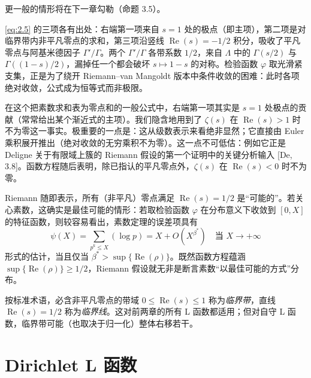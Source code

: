 更一般的情形将在下一章勾勒（命题 3.5）。

\begin{annote}
\eqref{eq:2.5} 的三项各有出处：右端第一项来自 $s=1$ 处的极点（即主项），第二项是对临界带内非平凡零点的求和，第三项沿竖线 $\operatorname{Re}(s)=-1/2$ 积分，吸收了平凡零点与阿基米德因子 $\Gamma'/\Gamma$。两个 $\Gamma'/\Gamma$ 各带系数 $1/2$，来自 $\Lambda$ 中的 $\Gamma(s/2)$ 与 $\Gamma((1-s)/2)$，漏掉任一个都会破坏 $s\mapsto 1-s$ 的对称。检验函数 $\varphi$ 取光滑紧支集，正是为了绕开 Riemann--van Mangoldt 版本中条件收敛的困难：此时各项绝对收敛，公式成为恒等式而非极限。
\par\vspace{0.15em}{\raggedleft 【来源：Iwaniec--Kowalski《Analytic Number Theory》显式公式一章（A）；Davenport《Multiplicative Number Theory》显式公式一章（A）】\par}
\end{annote}

在这个把素数求和表为零点和的一般公式中，右端第一项其实是 $s=1$ 处极点的贡献（常常给出某个渐近式的主项）。我们隐含地用到了 $\zeta(s)$ 在 $\operatorname{Re}(s)>1$ 时不为零这一事实。极重要的一点是：这从级数表示来看绝非显然；它直接由 Euler 乘积展开推出（绝对收敛的无穷乘积不为零）。这一点不可低估：例如它正是 Deligne 关于有限域上簇的 Riemann 假设的第一个证明中的关键分析输入 [De, 3.8]。函数方程随后表明，除已指认的平凡零点外，$\zeta(s)$ 在 $\operatorname{Re}(s)<0$ 时不为零。

Riemann 随即表示，所有（非平凡）零点满足 $\operatorname{Re}(s)=1/2$ 是“可能的”。若关心素数，这确实是最佳可能的情形：若取检验函数 $\varphi$ 在分布意义下收敛到 $[0,X]$ 的特征函数，则较容易看出，素数定理的误差项具有
\begin{equation}\tag{2.6}\label{eq:2.6}
\psi(X)=\sum_{p^{k}\le X}(\log p)=X+O(X^{\beta^{*}})
\quad\text{当 } X\to+\infty
\end{equation}
形式的估计，当且仅当 $\beta^{*}>\sup\{\operatorname{Re}(\rho)\}$。既然函数方程蕴涵 $\sup\{\operatorname{Re}(\rho)\}\ge 1/2$，Riemann 假设就无非是断言素数“以最佳可能的方式”分布。

按标准术语，必含非平凡零点的带域 $0\le\operatorname{Re}(s)\le 1$ 称为\emph{临界带}，直线 $\operatorname{Re}(s)=1/2$ 称为\emph{临界线}。这对前两章的所有 L 函数都适用；但对自守 L 函数，临界带可能（也取决于归一化）整体右移若干。

\section{Dirichlet L 函数}\label{sec:3}

